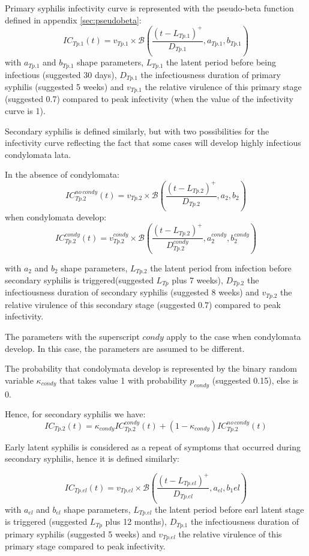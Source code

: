 \documentclass[11pt, onecolumn]{article}
\begin{document}
Primary syphilis infectivity curve is represented with the pseudo-beta function defined in appendix \ref{sec:pseudobeta}:
$$IC_{Tp.1}(t) = v_{Tp.1}\times\mathcal{B} \left(\frac{(t-L_{Tp.1})^
+}{D_{Tp.1}}, a_{Tp.1},b_{Tp.1} \right) $$
with $a_{Tp.1}$ and $b_{Tp.1}$ shape parameters, $L_{Tp.1}$ the latent period before being infectious (suggested 30 days), $D_{Tp.1}$ the infectiousness duration of primary syphilis (suggested 5 weeks) and $v_{Tp.1}$ the relative virulence of this primary stage (suggested 0.7) compared to peak infectivity (when the value of the infectivity curve is 1).

Secondary syphilis is defined similarly, but with two possibilities for the infectivity curve reflecting the fact that some cases will develop highly infectious condylomata lata.

In the absence of condylomata:
$$IC_{Tp.2}^{no\,condy}(t) = v_{Tp.2}\times\mathcal{B} \left(\frac{(t-L_{Tp.2})^
+}{D_{Tp.2}}, a_2,b_2 \right) $$
when condylomata develop:
$$IC_{Tp.2}^{condy}(t) = v_{Tp.2}^{condy}\times\mathcal{B} \left(\frac{(t-L_{Tp.2})^
+}{D_{Tp.2}^{condy}}, a_2^{condy},b_2^{condy} \right) $$

with $a_2$ and $b_2$ shape parameters, $L_{Tp.2}$ the latent period from infection before secondary syphilis is triggered(suggested $L_{Tp}$ plus 7 weeks), $D_{Tp.2}$ the infectiousness duration of secondary syphilis (suggested 8 weeks) and $v_{Tp.2}$ the relative virulence of this secondary stage (suggested 0.7) compared to peak infectivity. 

The parameters with the superscript $condy$ apply to the case when condylomata develop. In this case, the parameters are assumed to be different.

The probability that condolymata develop is represented by the binary random variable $\kappa_{condy}$ that takes value 1 with probability $p_{condy}$ (suggested 0.15), else is 0.

Hence, for secondary syphilis we have:
$$IC_{Tp.2}(t)  = \kappa_{condy}IC_{Tp.2}^{condy}(t) +(1-\kappa_{condy})IC_{Tp.2}^{no\,condy}(t) $$

Early latent syphilis is considered as a repeat of symptoms that occurred during secondary syphilis, hence it is defined similarly:

$$IC_{Tp.el}(t) = v_{Tp.el}\times\mathcal{B} \left(\frac{(t-L_{Tp.el})^
+}{D_{Tp.el}}, a_{el},b_1{el} \right) $$
with $a_{el}$ and $b_{el}$ shape parameters, $L_{Tp.el}$ the latent period before earl latent stage is triggered (suggested $L_{Tp}$ plus 12 months), $D_{Tp.1}$ the infectiousness duration of primary syphilis (suggested 5 weeks) and $v_{Tp.el}$ the relative virulence of this primary stage compared to peak infectivity.
\end{document}
